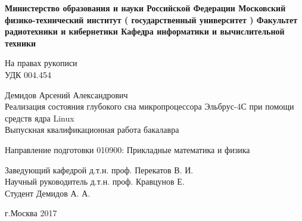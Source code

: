 \begin{titlepage}

\begin{center}
\bf Министерство образования и науки Российской Федерации
Московский физико-технический институт
 ( государственный университет )
\vspace{1cm}
Факультет радиотехники и кибернетики
Кафедра информатики и вычислительной техники
\vspace{3cm}
\end{center}
\begin{flushright}
\vbox{
На правах рукописи\\
УДК 004.454
}
\end{flushright}

\vspace{4em}

\begin{center}
Демидов Арсений Александрович\\
\large Реализация состояния глубокого сна микропроцессора Эльбрус-4С при помощи средств ядра Linux\\
\vspace{1.5em}
\large{Выпускная квалификационная  работа бакалавра}
\end{center}
\vspace{1.5em}
\begin{center}
 Направление подготовки 010900: Прикладные математика и физика
\end{center}
\vspace{7em}

\begin{flushleft}
Заведующий кафедрой д.т.н. проф. Перекатов В. И. \\
Научный руководитель д.т.н. проф. Кравцунов Е. \\
Студент Демидов А. А. \\
\end{flushleft}

\vfill

\begin{center}
г.Москва
2017
\end{center}

\end{titlepage}
